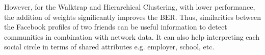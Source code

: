 \documentclass[11pt]{article}       %
\begin{document}
However, for the Walktrap and Hierarchical Clustering, with lower performance, the addition of weights significantly improves the BER. Thus, similarities between the Facebook profiles of two friends can be useful information to detect communities in combination with network data. It can also help interpreting each social circle in terms of shared attributes e.g. employer, school, etc.\\










\newpage

\nocite{*}



\end{document}
